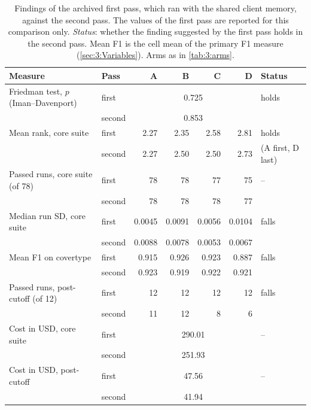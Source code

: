 \begin{table}[htbp]
  \centering
  \small
  \caption[First pass against second pass]{Findings of the archived first pass, which ran with the shared client memory, against the second pass. The values of the first pass are reported for this comparison only. \emph{Status}: whether the finding suggested by the first pass holds in the second pass. Mean F1 is the cell mean of the primary F1 measure (\autoref{sec:3:Variables}). Arms as in \autoref{tab:3:arms}.}
  \label{tab:5:contamination}
  \begin{tabular}{llrrrrl}
    \toprule
    Measure & Pass & A & B & C & D & Status \\
    \midrule
    Friedman test, $p$ (Iman--Davenport) & first & \multicolumn{4}{c}{0.725} & holds \\
     & second & \multicolumn{4}{c}{0.853} &  \\
    \addlinespace
    Mean rank, core suite & first & 2.27 & 2.35 & 2.58 & 2.81 & holds \\
     & second & 2.27 & 2.50 & 2.50 & 2.73 & (A first, D last) \\
    \addlinespace
    Passed runs, core suite (of 78) & first & 78 & 78 & 77 & 75 & -- \\
     & second & 78 & 78 & 78 & 77 &  \\
    \addlinespace
    Median run SD, core suite & first & 0.0045 & 0.0091 & 0.0056 & 0.0104 & falls \\
     & second & 0.0088 & 0.0078 & 0.0053 & 0.0067 &  \\
    \addlinespace
    Mean F1 on covertype & first & 0.915 & 0.926 & 0.923 & 0.887 & falls \\
     & second & 0.923 & 0.919 & 0.922 & 0.921 &  \\
    \addlinespace
    Passed runs, post-cutoff (of 12) & first & 12 & 12 & 12 & 12 & falls \\
     & second & 11 & 12 & 8 & 6 &  \\
    \addlinespace
    Cost in USD, core suite & first & \multicolumn{4}{c}{290.01} & -- \\
     & second & \multicolumn{4}{c}{251.93} &  \\
    \addlinespace
    Cost in USD, post-cutoff & first & \multicolumn{4}{c}{47.56} & -- \\
     & second & \multicolumn{4}{c}{41.94} &  \\
    \bottomrule
  \end{tabular}
\end{table}
